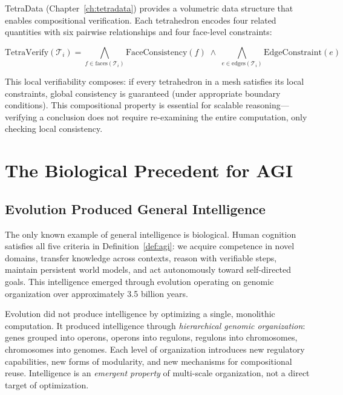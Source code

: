 TetraData (Chapter~\ref{ch:tetradata}) provides a volumetric data structure that enables compositional verification. Each tetrahedron encodes four related quantities with six pairwise relationships and four face-level constraints:

\begin{equation}
\text{TetraVerify}(\mathcal{T}_i) = \bigwedge_{f \in \text{faces}(\mathcal{T}_i)} \text{FaceConsistency}(f) \;\wedge\; \bigwedge_{e \in \text{edges}(\mathcal{T}_i)} \text{EdgeConstraint}(e)
\label{eq:tetra-verify}
\end{equation}

This local verifiability composes: if every tetrahedron in a mesh satisfies its local constraints, global consistency is guaranteed (under appropriate boundary conditions). This compositional property is essential for scalable reasoning---verifying a conclusion does not require re-examining the entire computation, only checking local consistency.

\section{The Biological Precedent for AGI}
\label{sec:biology-path}

\subsection{Evolution Produced General Intelligence}

The only known example of general intelligence is biological. Human cognition satisfies all five criteria in Definition~\ref{def:agi}: we acquire competence in novel domains, transfer knowledge across contexts, reason with verifiable steps, maintain persistent world models, and act autonomously toward self-directed goals. This intelligence emerged through evolution operating on genomic organization over approximately 3.5 billion years.

\begin{bioinsight}
Evolution did not produce intelligence by optimizing a single, monolithic computation. It produced intelligence through \emph{hierarchical genomic organization}: genes grouped into operons, operons into regulons, regulons into chromosomes, chromosomes into genomes. Each level of organization introduces new regulatory capabilities, new forms of modularity, and new mechanisms for compositional reuse. Intelligence is an \emph{emergent property} of multi-scale organization, not a direct target of optimization.
\end{bioinsight}

